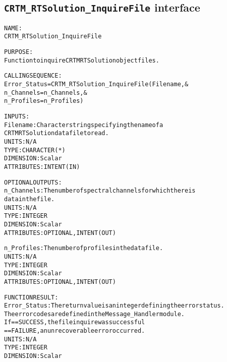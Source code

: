 \subsection{\texttt{CRTM\_RTSolution\_InquireFile} interface}
  \label{sec:CRTM_RTSolution_InquireFile_interface}
  \begin{alltt}
 
  NAME:
        CRTM_RTSolution_InquireFile
 
  PURPOSE:
        Function to inquire CRTM RTSolution object files.
 
  CALLING SEQUENCE:
        Error_Status = CRTM_RTSolution_InquireFile( Filename               , &
                                                    n_Channels = n_Channels, &
                                                    n_Profiles = n_Profiles  )
 
  INPUTS:
        Filename:       Character string specifying the name of a
                        CRTM RTSolution data file to read.
                        UNITS:      N/A
                        TYPE:       CHARACTER(*)
                        DIMENSION:  Scalar
                        ATTRIBUTES: INTENT(IN)
 
  OPTIONAL OUTPUTS:
        n_Channels:     The number of spectral channels for which there is
                        data in the file.
                        UNITS:      N/A
                        TYPE:       INTEGER
                        DIMENSION:  Scalar
                        ATTRIBUTES: OPTIONAL, INTENT(OUT)
 
        n_Profiles:     The number of profiles in the data file.
                        UNITS:      N/A
                        TYPE:       INTEGER
                        DIMENSION:  Scalar
                        ATTRIBUTES: OPTIONAL, INTENT(OUT)
 
  FUNCTION RESULT:
        Error_Status:   The return value is an integer defining the error status.
                        The error codes are defined in the Message_Handler module.
                        If == SUCCESS, the file inquire was successful
                           == FAILURE, an unrecoverable error occurred.
                        UNITS:      N/A
                        TYPE:       INTEGER
                        DIMENSION:  Scalar
 
  \end{alltt}
